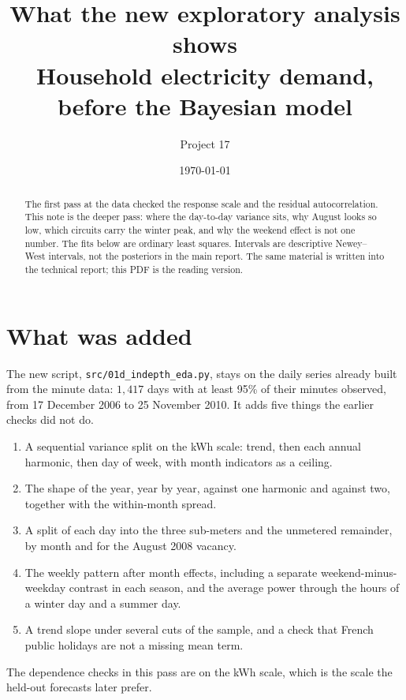 \documentclass[11pt]{article}
\title{\vspace{-1.2cm}\textbf{What the new exploratory analysis shows}\\[4pt]
\large Household electricity demand, before the Bayesian model}
\author{Project 17}
\date{\today}
\begin{document}
\maketitle
\thispagestyle{fancy}

\begin{abstract}
\noindent
The first pass at the data checked the response scale and the residual
autocorrelation. This note is the deeper pass: where the day-to-day variance
sits, why August looks so low, which circuits carry the winter peak, and why
the weekend effect is not one number. The fits below are ordinary least
squares. Intervals are descriptive Newey--West intervals, not the posteriors
in the main report. The same material is written into the technical report;
this PDF is the reading version.
\end{abstract}

\section{What was added}

The new script, \texttt{src/01d\_indepth\_eda.py}, stays on the daily series
already built from the minute data: $1{,}417$ days with at least 95\% of their
minutes observed, from 17 December 2006 to 25 November 2010. It adds five
things the earlier checks did not do.

\begin{enumerate}
\item A sequential variance split on the kWh scale: trend, then each annual
harmonic, then day of week, with month indicators as a ceiling.
\item The shape of the year, year by year, against one harmonic and against
two, together with the within-month spread.
\item A split of each day into the three sub-meters and the unmetered
remainder, by month and for the August 2008 vacancy.
\item The weekly pattern after month effects, including a separate
weekend-minus-weekday contrast in each season, and the average power through
the hours of a winter day and a summer day.
\item A trend slope under several cuts of the sample, and a check that French
public holidays are not a missing mean term.
\end{enumerate}

The dependence checks in this pass are on the kWh scale, which is the scale
the held-out forecasts later prefer.
\end{document}
